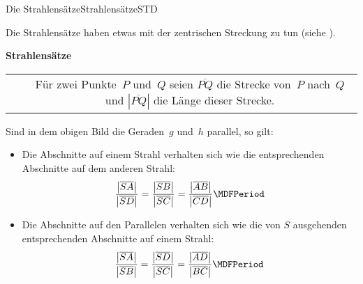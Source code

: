 \begin{MXContent}{Die Strahlens\"atze}{Strahlens\"atze}{STD}

Die Strahlens\"atze haben etwas mit der zentrischen Streckung zu tun (siehe ).


\ifttm%
\relax
\else%
\newcommand{\Strahlensatzfigur}[1][]
{%
\coordinate (S) at (0,0);
\coordinate (A) at ($ (S) + (3,0.5) $);
\coordinate (D) at ($ (S) + (4,2.5) $);
\coordinate (B) at ($ (S)!1.7!(A) $);
\coordinate (C) at ($ (S)!1.7!(D) $);
%
\path (S) node[left]{$S$} (A) node[below right]{$A$} (B) node[below right]{$B$}
                          (C) node[above left] {$C$} (D) node[above left] {$D$};
%
\draw (S) -- ($ (S)!1.1!(B) $);
\draw (S) -- ($ (S)!1.1!(C) $);
%
\draw[#1] ($ (A)!-0.2!(D) $) -- ($ (D)!-1!(A) $) node[left]{$g$};
\draw ($ (B)!-0.2!(C) $) node[right]{$h$} -- ($ (C)!-0.1!(B) $);
}
\fi

\begin{MInfo}%
\textbf{Strahlens\"atze}

\begin{tabular}{lc}
\mbox{
\MTikzAuto{%
\begin{tikzpicture}
\Strahlensatzfigur
\end{tikzpicture}
}
}
&
\begin{minipage}[b]{7cm}
F\"ur zwei Punkte~$P$ und~$Q$ seien $\overline{PQ}$ die Strecke von~$P$ nach~$Q$
und $\left| \overline{PQ} \right|$ die L\"ange dieser Strecke.
\vspace*{2cm}
\end{minipage}
\end{tabular}


Sind in dem obigen Bild die Geraden~$g$ und~$h$ parallel, so gilt:
\begin{itemize}
\item
Die Abschnitte auf einem Strahl verhalten sich wie die entsprechenden Abschnitte auf dem anderen Strahl:
\[
   \frac{\left| \overline{SA} \right|}{\left| \overline{SD} \right|}
 = \frac{\left| \overline{SB} \right|}{\left| \overline{SC} \right|}
 = \frac{\left| \overline{AB} \right|}{\left| \overline{CD} \right|} \MDFPeriod
\]
\item
Die Abschnitte auf den Parallelen  verhalten sich wie die von $S$ ausgehenden entsprechenden Abschnitte auf einem Strahl:
\[
   \frac{\left| \overline{SA} \right|}{\left| \overline{SB} \right|}
 = \frac{\left| \overline{SD} \right|}{\left| \overline{SC} \right|}
 = \frac{\left| \overline{AD} \right|}{\left| \overline{BC} \right|} \MDFPeriod
\]


\end{itemize}
\end{MInfo}
\end{MXContent}
